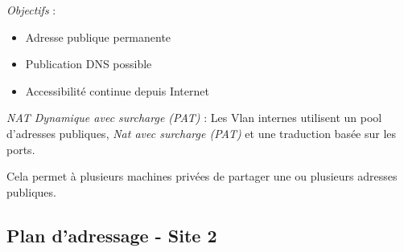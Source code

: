 \documentclass[12pt,a4paper, oneside]{memoir}
\begin{document}
\begin{enumerate}
\textit{Objectifs }:
\begin{itemize}[label*=$\star$]
	\item Adresse publique permanente
	\item Publication DNS possible
	\item Accessibilité continue depuis Internet
\end{itemize} 


\textit{NAT Dynamique avec surcharge (PAT)} : Les Vlan internes utilisent un pool d'adresses publiques, \textit{Nat avec surcharge (PAT)} et une traduction basée sur les ports. 

Cela permet à plusieurs machines privées de partager une ou plusieurs adresses publiques.
\end{enumerate}

\subsection{Plan d'adressage - Site 2}
\end{document}
